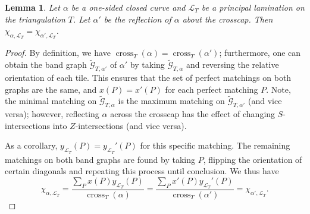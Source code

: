 \documentclass[pdftex]{sigma}
\numberwithin{equation}{section}
\newtheorem{Lemma}[Theorem]{Lemma}
\theoremstyle{definition}
\begin{document}
\begin{Lemma}\label{lemma:reflections}
 Let $\alpha$ be a one-sided closed curve and $\mathcal{L}_T$ be a principal lamination on the triangulation $T$. Let $\alpha'$ be the reflection of $\alpha$ about the crosscap. Then $\chi_{\alpha, \mathcal{L}_T}=\chi_{\alpha', \mathcal{L}_T}$.
\end{Lemma}
\begin{proof}
 By definition, we have $\operatorname{cross}_T(\alpha)=\operatorname{cross}_T(\alpha')$; furthermore, one can obtain the band graph $\widetilde{\mathcal{G}}_{T, \alpha'}$ of $\alpha'$ by taking $\widetilde{\mathcal{G}}_{T, \alpha}$ and reversing the relative orientation of each tile. This ensures that the set of perfect matchings on both graphs are the same, and $x(P)=x'(P)$ for each perfect matching $P$. Note, the minimal matching on $\widetilde{\mathcal{G}}_{T, \alpha}$ is the maximum matching on $\widetilde{\mathcal{G}}_{T, \alpha'}$ (and vice versa); however, reflecting $\alpha$ across the crosscap has the effect of changing $S$-intersections into $Z$-intersections (and vice versa).

 As a corollary, $y_{\mathcal{L}_T}(P)=y_{\mathcal{L}_T}'(P)$ for this specific matching. The remaining matchings on both band graphs are found by taking $P$, flipping the orientation of certain diagonals and repeating this process until conclusion. We thus have \[\chi_{\alpha, \mathcal{L}_T}=\frac{\sum_P x(P)y_{\mathcal{L}_T}(P)}{\operatorname{cross}_T(\alpha)}=\frac{\sum_{P} x'(P)y_{\mathcal{L}_T}'(P)}{\operatorname{cross}_T(\alpha')}=\chi_{\alpha', \mathcal{L}_T}.\tag*{\qed}\] \renewcommand{\qed}{}
\end{proof}
\end{document}
